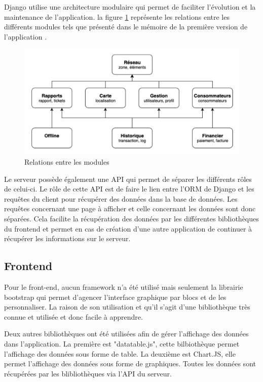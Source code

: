 \documentclass{EPL-master-thesis-covers-FR}
\begin{document}
				Django utilise une architecture modulaire qui permet de faciliter l'évolution et la maintenance de l'application. la figure \ref{fig:modules} représente les relations entre les différents modules tels que présenté dans le mémoire de la première version de l'application \cite{ref:haitiwater}.
				
				\begin{figure}[H]
					\centering
					\includegraphics[width=1\textwidth]{images/modules}
					\caption{Relations entre les modules}
					\label{fig:modules}
				\end{figure}
							
				
				Le serveur possède également une API qui permet de séparer les différents rôles de celui-ci. Le rôle de cette API est de faire le lien entre l'ORM de Django et les requêtes du client pour récupérer des données dans la base de données. Les requêtes concernant une page à afficher et celle concernant les données sont donc séparées. Cela facilite la récupération des données par les différentes bibliothèques du frontend et permet en cas de création d'une autre application de continuer à récupérer les informations sur le serveur.
						
			\subsection*{Frontend}
				Pour le front-end, aucun framework n'a été utilisé mais seulement la librairie bootstrap qui permet d'agencer l'interface graphique par blocs et de les personnaliser. La raison de son utilisation et qu'il s'agit d'une bibliothèque très connue et utilisée et donc facile à apprendre.
				
				Deux autres bibliothèques ont été utilisées afin de gérer l'affichage des données dans l'application. La première est "datatable.js", cette bilbiothèque permet l'affichage des données sous forme de table. La deuxième est Chart.JS, elle permet l'affichage des données sous forme de graphiques. Toutes les données sont récupérées par les blibliothèques via l'API du serveur.
				
\end{document}
